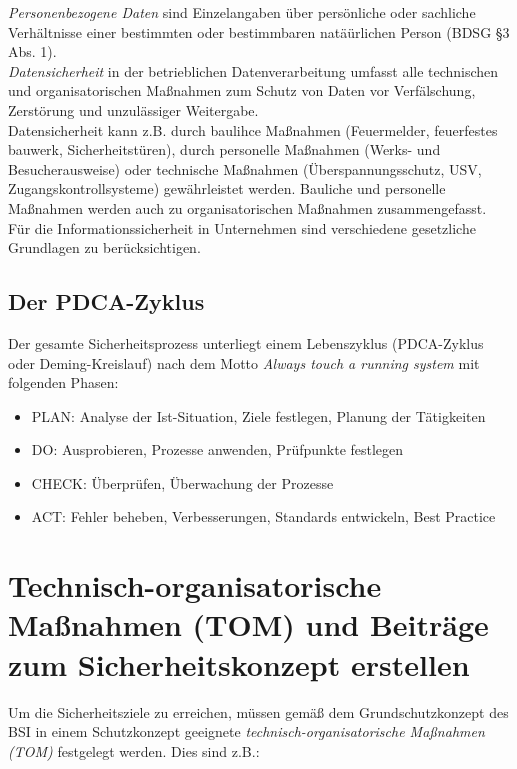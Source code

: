 \documentclass[a4paper, 12pt]{report}
\begin{document}
\begin{multicols}{2}
\emph{Personenbezogene Daten} sind Einzelangaben über persönliche oder sachliche
Verhältnisse einer bestimmten oder bestimmbaren natäürlichen Person (BDSG \S 3 
Abs. 1). \\

\emph{Datensicherheit} in der betrieblichen Datenverarbeitung umfasst alle 
technischen und organisatorischen Maßnahmen zum Schutz von Daten vor 
Verfälschung, Zerstörung und unzulässiger Weitergabe. \\

Datensicherheit kann z.B. durch baulihce Maßnahmen (Feuermelder, 
feuerfestes bauwerk, Sicherheitstüren), durch personelle Maßnahmen (Werks- und 
Besucherausweise) oder technische Maßnahmen (Überspannungsschutz, USV, 
Zugangskontrollsysteme) gewährleistet werden. Bauliche und personelle Maßnahmen
werden auch zu organisatorischen Maßnahmen zusammengefasst. \\

Für die Informationssicherheit in Unternehmen sind verschiedene gesetzliche 
Grundlagen zu berücksichtigen.

\subsection{Der PDCA-Zyklus}

Der gesamte Sicherheitsprozess unterliegt einem Lebenszyklus (PDCA-Zyklus oder 
Deming-Kreislauf) nach dem Motto \emph{Always touch a running system} mit 
folgenden Phasen: 

\begin{itemize}
	\item PLAN: Analyse der Ist-Situation, Ziele festlegen, Planung der 
		Tätigkeiten
	\item DO: Ausprobieren, Prozesse anwenden, Prüfpunkte festlegen
	\item CHECK: Überprüfen, Überwachung der Prozesse
	\item ACT: Fehler beheben, Verbesserungen, Standards entwickeln, 
		Best Practice
\end{itemize}

\section{Technisch-organisatorische Maßnahmen (TOM) und Beiträge zum 
Sicherheitskonzept erstellen} %

Um die Sicherheitsziele zu erreichen, müssen gemäß dem Grundschutzkonzept des 
BSI in einem Schutzkonzept geeignete \emph{technisch-organisatorische Maßnahmen 
(TOM)} festgelegt werden. Dies sind z.B.:


\end{multicols}
\end{document}
